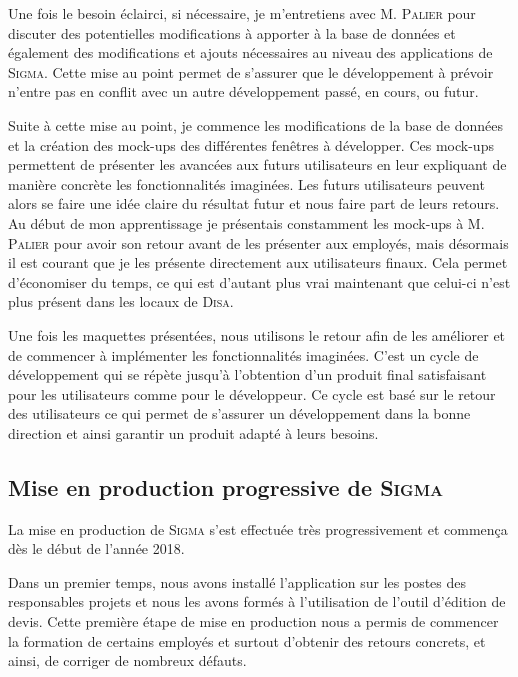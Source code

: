 Une fois le besoin éclairci, si nécessaire, je m'entretiens avec M. \textsc{Palier} pour discuter des potentielles modifications à apporter à la base de données et également des modifications et ajouts nécessaires au niveau des applications de \textsc{Sigma}.
Cette mise au point permet de s'assurer que le développement à prévoir n'entre pas en conflit avec un autre développement passé, en cours, ou futur.

Suite à cette mise au point, je commence les modifications de la base de données et la création des mock-ups des différentes fenêtres à développer.
Ces mock-ups permettent de présenter les avancées aux futurs utilisateurs en leur expliquant de manière concrète les fonctionnalités imaginées.
Les futurs utilisateurs peuvent alors se faire une idée claire du résultat futur et nous faire part de leurs retours.
Au début de mon apprentissage je présentais constamment les mock-ups à M. \textsc{Palier} pour avoir son retour avant de les présenter aux employés, mais désormais il est courant que je les présente directement aux utilisateurs finaux.
Cela permet d'économiser du temps, ce qui est d'autant plus vrai maintenant que celui-ci n'est plus présent dans les locaux de \textsc{Disa}.

Une fois les maquettes présentées, nous utilisons le retour afin de les améliorer et de commencer à implémenter les fonctionnalités imaginées.
C'est un cycle de développement qui se répète jusqu'à l'obtention d'un produit final satisfaisant pour les utilisateurs comme pour le développeur.
Ce cycle est basé sur le retour des utilisateurs ce qui permet de s'assurer un développement dans la bonne direction et ainsi garantir un produit adapté à leurs besoins.

\subsection{Mise en production progressive de \textsc{Sigma}}

La mise en production de \textsc{Sigma} s'est effectuée très progressivement et commença dès le début de l'année 2018.

Dans un premier temps, nous avons installé l'application sur les postes des responsables projets et nous les avons formés à l'utilisation de l'outil d'édition de devis.
Cette première étape de mise en production nous a permis de commencer la formation de certains employés et surtout d'obtenir des retours concrets, et ainsi, de corriger de nombreux défauts.

